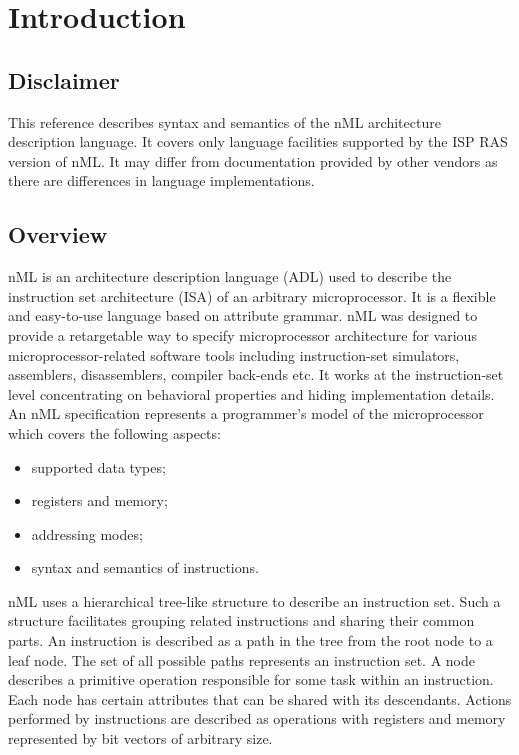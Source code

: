 \chapter{Introduction}


\section{Disclaimer}

This reference describes syntax and semantics of the nML architecture
description language. It covers only language facilities supported by the ISP RAS
version of nML. It may differ from documentation provided by other vendors as
there are differences in language implementations.


\section{Overview}

nML is an architecture description language (ADL) used to describe the
instruction set architecture (ISA) of an arbitrary microprocessor. It is a
flexible and easy-to-use language based on attribute grammar. nML was designed
to provide a retargetable way to specify microprocessor architecture for
various microprocessor-related software tools including instruction-set
simulators, assemblers, disassemblers, compiler back-ends etc. It works at
the instruction-set level concentrating on behavioral properties and hiding
implementation details. An nML specification represents a programmer's model
of the microprocessor which covers the following aspects:

\begin{itemize}
\item supported data types;
\item registers and memory;
\item addressing modes;
\item syntax and semantics of instructions.
\end{itemize}

nML uses a hierarchical tree-like structure to describe an instruction set.
Such a structure facilitates grouping related instructions and sharing their
common parts. An instruction is described as a path in the tree from the root
node to a leaf node. The set of all possible paths represents an instruction
set. A node describes a primitive operation responsible for some task within
an instruction. Each node has certain attributes that can be shared with its
descendants. Actions performed by instructions are described as operations
with registers and memory represented by bit vectors of arbitrary size.

